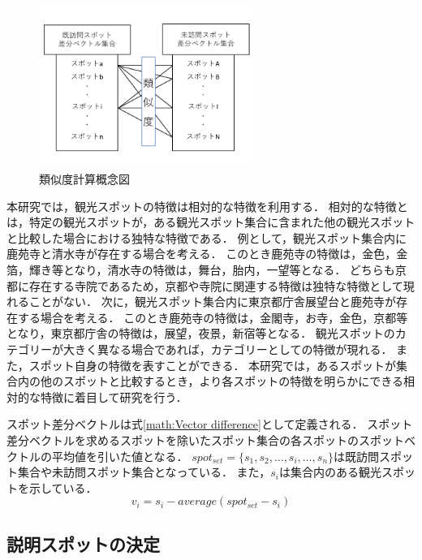 \documentclass{deimj}
\begin{document}
\begin{figure}[t]
  \begin{center}
    \includegraphics[clip,width=7.0cm]{picture/Photo_CosSim_jap.png}
    \caption{類似度計算概念図}
    \label{fig:photo_cossim}
    \end{center}
\end{figure}

本研究では，観光スポットの特徴は相対的な特徴を利用する．
相対的な特徴とは，特定の観光スポットが，ある観光スポット集合に含まれた他の観光スポットと比較した場合における独特な特徴である．
例として，観光スポット集合内に鹿苑寺と清水寺が存在する場合を考える．
このとき鹿苑寺の特徴は，金色，金箔，輝き等となり，清水寺の特徴は，舞台，胎内，一望等となる．
どちらも京都に存在する寺院であるため，京都や寺院に関連する特徴は独特な特徴として現れることがない．
次に，観光スポット集合内に東京都庁舎展望台と鹿苑寺が存在する場合を考える．
このとき鹿苑寺の特徴は，金閣寺，お寺，金色，京都等となり，東京都庁舎の特徴は，展望，夜景，新宿等となる．
観光スポットのカテゴリーが大きく異なる場合であれば，カテゴリーとしての特徴が現れる．
また，スポット自身の特徴を表すことができる．
本研究では，あるスポットが集合内の他のスポットと比較するとき，より各スポットの特徴を明らかにできる相対的な特徴に着目して研究を行う．

スポット差分ベクトルは式\ref{math:Vector difference}として定義される．
スポット差分ベクトルを求めるスポットを除いたスポット集合の各スポットのスポットベクトルの平均値を引いた値となる．
$spot_{set} =\{s_1,s_2,\dots,s_i,\dots,s_n\}$は既訪問スポット集合や未訪問スポット集合となっている．
また，$s_i$は集合内のある観光スポットを示している．
\begin{equation}
  v_i=s_i-average(spot_{set}-s_i)
    \label{math:Vector difference}
\end{equation}


\subsection{説明スポットの決定}
\label{subsec:Determination of explainable spot}
\end{document}
